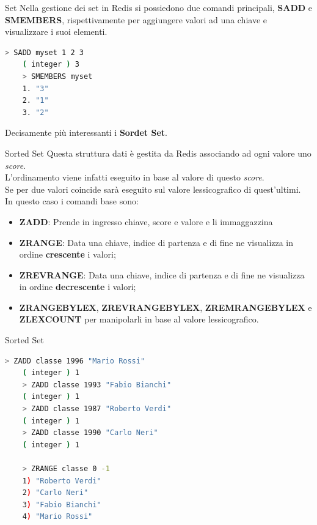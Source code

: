 \documentclass[xcolor=dvipsnames]{beamer}
\begin{document}
\begin{frame}[fragile]{Set}
  Nella gestione dei set in Redis si possiedono due comandi principali, \textbf{SADD} e \textbf{SMEMBERS},
  rispettivamente per aggiungere valori ad una chiave e visualizzare i suoi elementi.
  \begin{lstlisting}[language=bash]
    > SADD myset 1 2 3
    ( integer ) 3
    > SMEMBERS myset
    1. "3"
    2. "1"
    3. "2"
  \end{lstlisting}

  Decisamente più interessanti i \textbf{Sordet Set}.


\end{frame}

\begin{frame}[fragile]{Sorted Set}
  Questa struttura dati è gestita da Redis associando ad ogni valore uno \textit{score}.
  \\
  L'ordinamento viene infatti eseguito in base al valore di questo \textit{score}.\\
  Se per due valori coincide sarà eseguito sul valore lessicografico di quest'ultimi.
  \\
  In questo caso i comandi base sono:
  \begin{itemize}
    \item \textbf{ZADD}: Prende in ingresso chiave, score e valore e li immaggazzina
    \item \textbf{ZRANGE}: Data una chiave, indice di partenza e di fine ne visualizza in ordine \textbf{crescente} i valori;
    \item \textbf{ZREVRANGE}: Data una chiave, indice di partenza e di fine ne visualizza in ordine \textbf{decrescente} i valori;
    \item \textbf{ZRANGEBYLEX}, \textbf{ZREVRANGEBYLEX}, \textbf{ZREMRANGEBYLEX} e \textbf{ZLEXCOUNT} per manipolarli in base al valore lessicografico.
  \end{itemize}

\end{frame}

\begin{frame}[fragile]{Sorted Set}
  \begin{lstlisting}[language=bash]
    > ZADD classe 1996 "Mario Rossi"
    ( integer ) 1
    > ZADD classe 1993 "Fabio Bianchi"
    ( integer ) 1
    > ZADD classe 1987 "Roberto Verdi"
    ( integer ) 1
    > ZADD classe 1990 "Carlo Neri"
    ( integer ) 1

    > ZRANGE classe 0 -1
    1) "Roberto Verdi"
    2) "Carlo Neri"
    3) "Fabio Bianchi"
    4) "Mario Rossi"
  \end{lstlisting}
\end{frame}
\end{document}
